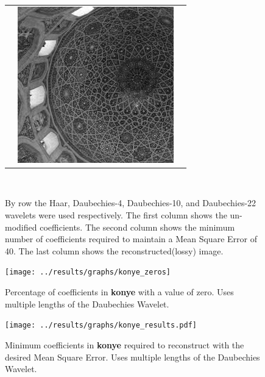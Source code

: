 \begin{figure}[hbt]
\begin{tabular}{ S @{} S @{} S }
		&	\includegraphics[height=0.25\textwidth]{../images/konye_d22_final} \\
	\end{tabular} \\
	\caption{By row the Haar, Daubechies-4, Daubechies-10, and Daubechies-22 wavelets were used 
					 respectively. The first
					 column shows the un-modified coefficients.  The second column shows the minimum number
					 of coefficients required to maintain a Mean Square Error of 40.
					 The last column shows the reconstructed(lossy) image.}
\end{figure}

\begin{figure}[hbt]
	\centering
	\label{fig:konye_zeros}
		\texttt{[image: ../results/graphs/konye\_zeros]}
	\caption{Percentage of coefficients in {\bf konye} with a value of zero. Uses multiple lengths of the Daubechies Wavelet. }
\end{figure}
\begin{figure}[hbt]
	\centering
	\label{fig:konye_stats}
		\texttt{[image: ../results/graphs/konye\_results.pdf]}
	\caption{Minimum coefficients in {\bf konye} required to reconstruct with the desired Mean Square Error. Uses multiple lengths of the Daubechies Wavelet. }
\end{figure}


